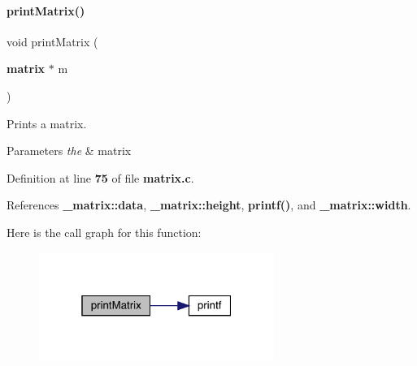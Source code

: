 \paragraph{print\+Matrix()}
{\footnotesize\ttfamily void print\+Matrix (\begin{DoxyParamCaption}\item[{\textbf{ matrix} $\ast$}]{m }\end{DoxyParamCaption})}



Prints a matrix. 


\begin{DoxyParams}{Parameters}
{\em the} & matrix \\
\hline
\end{DoxyParams}


Definition at line \textbf{ 75} of file \textbf{ matrix.\+c}.



References \textbf{ \+\_\+matrix\+::data}, \textbf{ \+\_\+matrix\+::height}, \textbf{ printf()}, and \textbf{ \+\_\+matrix\+::width}.


Here is the call graph for this function\+:\nopagebreak
\begin{figure}[H]
\begin{center}
\leavevmode
\includegraphics[width=217pt]{matrix_8c_a50ab2b1ac33d6993d93522fc4f30a051_cgraph}
\end{center}
\end{figure}
\mbox{\label{matrix_8c_acdd57777a972ce339153878fa917db14}} 
